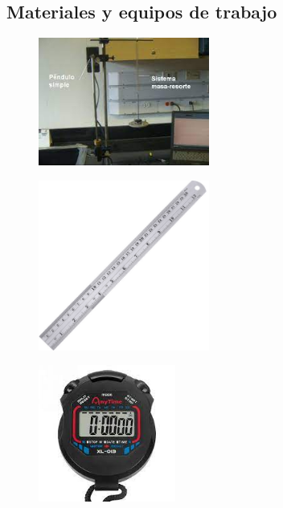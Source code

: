 \documentclass[10pt]{article}
\begin{document}
\subsection{Materiales y  equipos de trabajo}
\begin{figure}[H]
	\begin{center}
 		\includegraphics[width = 0.5\textwidth]{Imagenes/pen.jpg}
	\end{center} 
\end{figure}

\begin{figure}[H]
	\begin{center}
 		\includegraphics[width = 0.5\textwidth]{Imagenes/regla.jpg}
	\end{center} 
\end{figure}

\begin{figure}[H]
	\begin{center}
 		\includegraphics[width = 0.4\textwidth]{Imagenes/crono.jpg}
	\end{center} 
\end{figure}
\end{document}
